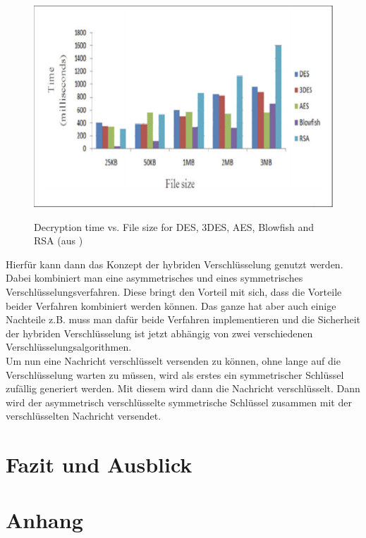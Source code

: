 \documentclass[12pt,a4paper]{scrartcl}
\begin{document}
\begin{figure}[h]		
\includegraphics[scale=0.6]{rsa_time} \\
\caption{Decryption time vs. File size for DES, 3DES, AES, Blowfish and RSA (aus \cite{rsatime})}
\label{fig:figure5}
\end{figure}


		Hierfür kann dann das Konzept der hybriden Verschlüsselung genutzt werden. Dabei kombiniert man eine asymmetrisches und eines symmetrisches Verschlüsselungsverfahren. Diese bringt den Vorteil mit sich, dass die Vorteile  beider Verfahren kombiniert werden können. Das ganze hat aber auch einige Nachteile z.B. muss man dafür beide Verfahren implementieren und die Sicherheit der hybriden Verschlüsselung ist jetzt abhängig von zwei verschiedenen Verschlüsselungsalgorithmen. \\
		Um nun eine Nachricht verschlüsselt versenden zu können, ohne lange auf die Verschlüsselung warten zu müssen, wird als erstes ein symmetrischer Schlüssel zufällig generiert werden. Mit diesem wird dann die Nachricht verschlüsselt. Dann wird der asymmetrisch verschlüsselte symmetrische Schlüssel zusammen mit der verschlüsselten Nachricht versendet.

\section{Fazit und Ausblick}

\pagebreak
\section{Anhang}

\listoffigures
\pagebreak

\nocite{*}
\printbibliography
\end{document}
